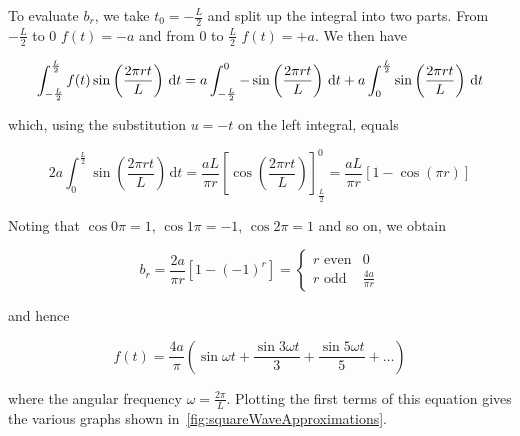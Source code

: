 To evaluate $b_r$, we take $t_0=-\frac{L}{2}$ and split up the integral into two
parts. From $-\frac{L}{2}$ to $0$ $f(t)=-a$ and from $0$ to
$\frac{L}{2}$ $f(t)=+a$.  We then have

\begin{equation*}
  \int_{-\frac{L}{2}}^{\frac{L}{2}} f(t)\sin\left(\frac{2\pi rt}{L}\right)\,\mathrm{d}t
  = a\int_{-\frac{L}{2}}^0 -\sin\left(\frac{2\pi rt}{L}\right)\,\mathrm{d}t + a\int_0^{\frac{L}{2}} \sin\left(\frac{2\pi rt}{L}\right)\,\mathrm{d}t\\
\end{equation*}

which, using the substitution $u=-t$ on the left integral, equals

\begin{equation*}
  2a\int_0^{\frac{L}{2}} \sin\left(\frac{2\pi rt}{L}\right)\,\mathrm{d}t
  = \frac{aL}{\pi r} \left[\cos\left(\frac{2\pi rt}{L}\right)\right]_{\frac{L}{2}}^0
  = \frac{aL}{\pi r}\left[1-\cos\left(\pi r\right)\right]
\end{equation*}

Noting that $\cos 0\pi = 1$, $\cos 1\pi = -1$, $\cos 2\pi=1$ and so on, we obtain

\begin{equation*}
  b_r = \frac{2a}{\pi r}\left[1-(-1)^r\right]
   = \begin{cases}
       r\text{ even} &  0\\
       r\text{ odd} & \frac{4a}{\pi r}
     \end{cases}
\end{equation*}

and hence

\begin{equation*}
  \boxed{f(t) = \frac{4a}{\pi}\left(\sin \omega t + \frac{\sin 3\omega t}{3} + \frac{\sin 5\omega t}{5} + \dots \right)}
\end{equation*}

where the angular frequency $\omega = \frac{2\pi}{L}$. Plotting the first terms
of this equation gives the various graphs shown
in~\cref{fig:squareWaveApproximations}.
